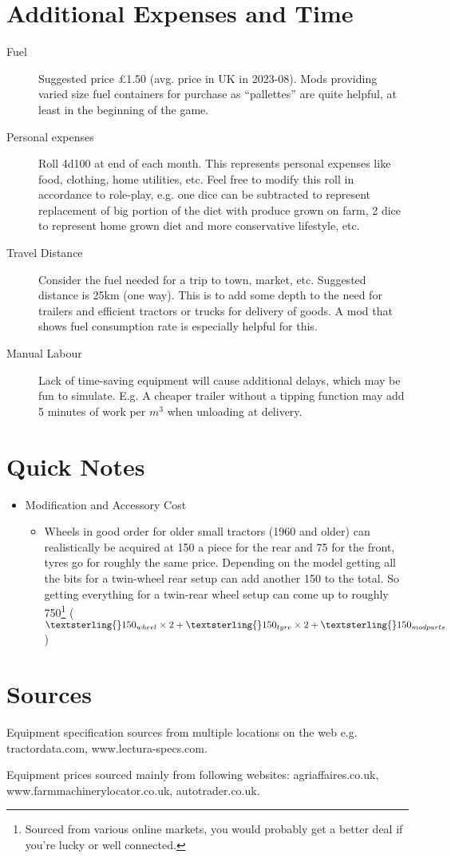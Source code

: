\documentclass[a4paper,10pt]{article}
\begin{document}
\section{Additional Expenses and Time}
\begin{description}
\item[Fuel] Suggested price \pounds{}1.50 (avg. price in UK in 2023-08). Mods
  providing varied size fuel containers for purchase as ``pallettes'' are quite
  helpful, at least in the beginning of the game.
\item[Personal expenses] Roll 4d100 at end of each month. This represents
  personal expenses like food, clothing, home utilities, etc. Feel free to
  modify this roll in accordance to role-play, e.g. one dice can be subtracted
  to represent replacement of big portion of the diet with produce grown on
  farm, 2 dice to represent home grown diet and more conservative lifestyle,
  etc.
\item[Travel Distance] Consider the fuel needed for a trip to town, market, etc.
  Suggested distance is 25km (one way). This is to add some depth to the need
  for trailers and efficient tractors or trucks for delivery of goods. A mod
  that shows fuel consumption rate is especially helpful for this.
\item[Manual Labour] Lack of time-saving equipment will cause additional
  delays, which may be fun to simulate. E.g. A cheaper trailer without a tipping
  function may add 5 minutes of work per $m^3$ when unloading at delivery.
\end{description}

\section{Quick Notes}

\begin{itemize}
\item Modification and Accessory Cost
  \begin{itemize}
  \item Wheels in good order for older small tractors (1960 and older) can
    realistically be acquired at \textsterling{}150 a piece for the rear and
    \textsterling{}75 for the front, tyres go for roughly the same
    price. Depending on the model getting all the bits for a twin-wheel rear
    setup can add another \textsterling{}150 to the total. So getting
    everything for a twin-rear wheel setup can come up to roughly
    \textsterling{}750\footnote{Sourced from various online markets, you would
      probably get a better deal if you're lucky or well connected.} ($
      \textsterling{}150_{wheel} \times 2 + \textsterling{}150_{tyre} \times 2 +
      \textsterling{}150_{mod parts}$)
  \end{itemize}
\end{itemize}

\section{Sources}
Equipment specification sources from multiple locations on the web
e.g. tractordata.com, www.lectura-specs.com.

Equipment prices sourced mainly from following websites: agriaffaires.co.uk,
www.farmmachinerylocator.co.uk, autotrader.co.uk.
\end{document}
